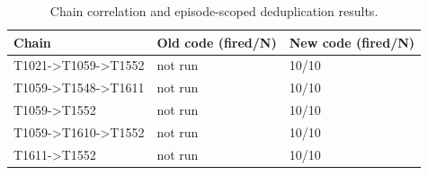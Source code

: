 \begin{table}[t]
\centering
\caption{Chain correlation and episode-scoped deduplication results.}
\label{tab:chain-dedup}
\begin{tabular}{lll}
\toprule
Chain & Old code (fired/N) & New code (fired/N) \\
\midrule
T1021->T1059->T1552 & not run & 10/10 \\
T1059->T1548->T1611 & not run & 10/10 \\
T1059->T1552 & not run & 10/10 \\
T1059->T1610->T1552 & not run & 10/10 \\
T1611->T1552 & not run & 10/10 \\
\bottomrule
\end{tabular}
\end{table}
